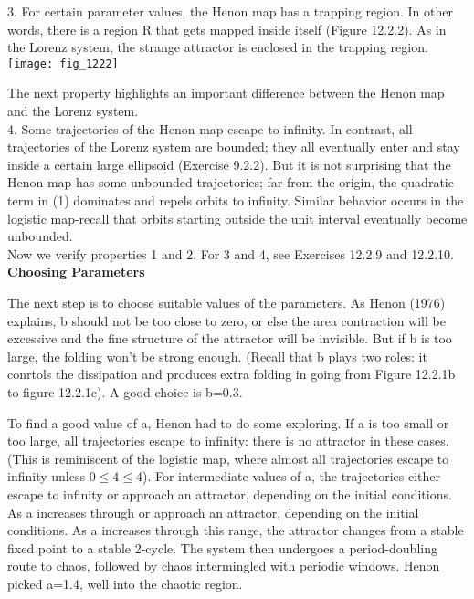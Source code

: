 \documentclass{article}
\newcommand\tab[1][1cm]{\hspace*{#1}}
\begin{document}
3. For certain parameter values, the Henon map has a trapping region. In other words, there is a region R that gets mapped inside itself (Figure 12.2.2). As in the Lorenz system, the strange attractor is enclosed in the trapping region. \\

\texttt{[image: fig\_1222]} 

\tab \tab The next property highlights an important difference between the Henon map and the Lorenz system. \\ 
4. Some trajectories of the Henon map escape to infinity. In contrast, all trajectories of the Lorenz system are bounded; they all eventually enter and stay inside a certain large ellipsoid (Exercise 9.2.2). But it is not surprising that the Henon map has some unbounded trajectories; far from the origin, the quadratic term in (1) dominates and repels orbits to infinity. Similar behavior occurs in the logistic map-recall that orbits starting outside the unit interval eventually become unbounded. \\ 

Now we verify properties 1 and 2. For 3 and 4, see Exercises 12.2.9 and 12.2.10. \\

\textbf {Choosing Parameters} \\ \tab

The next step is to choose suitable values of the parameters. As Henon (1976) explains, b should not be too close to zero, or else the area contraction will be excessive and the fine structure of the attractor will be invisible. But if b is too large, the folding won't be strong enough. (Recall that b plays two roles: it conrtols the dissipation and produces extra folding in going from Figure 12.2.1b to figure 12.2.1c). A good choice is b=0.3. \\ \tab

To find a good value of a, Henon had to do some exploring. If a is too small or too large, all trajectories escape to infinity: there is no attractor in these cases. (This is reminiscent of the logistic map, where almost all trajectories escape to infinity unless $0 \leq 4 \leq 4$). For intermediate values of a, the trajectories either escape to infinity or approach an attractor, depending on the initial conditions. As a increases through or approach an attractor, depending on the initial conditions. As a increases through this range, the attractor changes from a stable fixed point to a stable 2-cycle. The system then undergoes a period-doubling route to chaos, followed by chaos intermingled with periodic windows. Henon picked a=1.4, well into the chaotic region. \\ 
\end{document}
